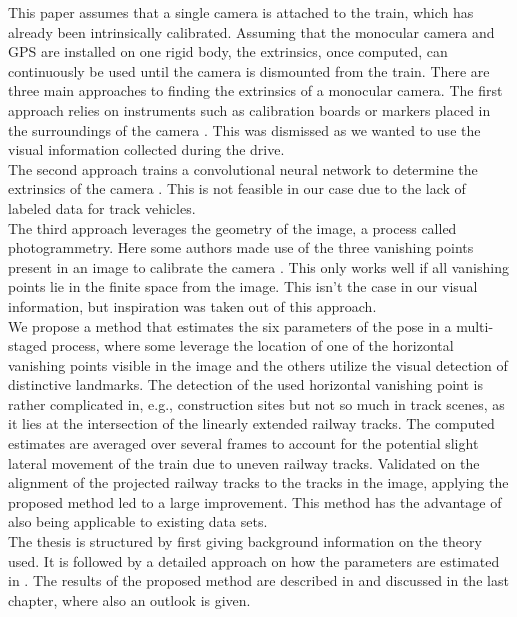 This paper assumes that a single camera is attached to the train, which has already been intrinsically calibrated. Assuming that the monocular camera and GPS are installed on one rigid body, the extrinsics, once computed, can continuously be used until the camera is dismounted from the train. There are three main approaches to finding the extrinsics of a monocular camera. The first approach relies on instruments such as calibration boards or markers placed in the surroundings of the camera \citep{wang2015inverse}. This was dismissed as we wanted to use the visual information collected during the drive.\\

The second approach trains a convolutional neural network to determine the extrinsics of the camera \citep{lin20203d}. This is not feasible in our case due to the lack of labeled data for track vehicles.\\

The third approach leverages the geometry of the image, a process called photogrammetry. Here some authors made use of the three vanishing points present in an image to calibrate the camera \citep{caprile1990using} \citep{brauer2001image} \citep{grammatikopoulos2007automatic} \citep{cipolla1999camera}. This only works well if all vanishing points lie in the finite space from the image. This isn't the case in our visual information, but inspiration was taken out of this approach.\\

We propose a method that estimates the six parameters of the pose in a multi-staged process, where some leverage the location of one of the horizontal vanishing points visible in the image \cite{namazi2022geolocation} and the others utilize the visual detection of distinctive landmarks. The detection of the used horizontal vanishing point is rather complicated in, e.g., construction sites but not so much in track scenes, as it lies at the intersection of the linearly extended railway tracks. The computed estimates are averaged over several frames to account for the potential slight lateral movement of the train due to uneven railway tracks. Validated on the alignment of the projected railway tracks to the tracks in the image, applying the proposed method led to a large improvement. This method has the advantage of also being applicable to existing data sets. \\

The thesis is structured by first giving background information on the theory used. It is followed by a detailed approach on how the parameters are estimated in . The results of the proposed method are described in  and discussed in the last chapter, where also an outlook is given.
